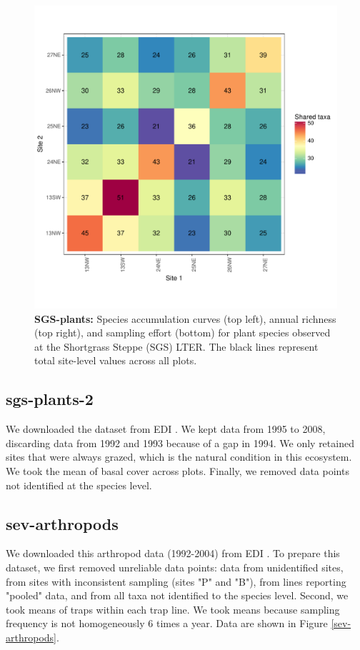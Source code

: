 \documentclass[11pt, oneside]{article}
\begin{document}
\begin{figure}[h!]
\includegraphics[scale = 0.4]{sgs-plants-catano_spp_shared.pdf}
\caption{{\bf SGS-plants:} Species accumulation curves (top left),  annual richness (top right), and sampling effort (bottom)  for plant species observed at the Shortgrass Steppe (SGS) LTER. The black lines represent total site-level values across all plots.}
\label{sgs-plants}
\end{figure}

\subsection{sgs-plants-2}
We downloaded the dataset from EDI \citep{Milchunas2014}. We kept data from 1995 to 2008, discarding data from 1992 and 1993 because of a gap in 1994. We only retained sites that were always grazed, which is the natural condition in this ecosystem. We took the mean of basal cover across plots. Finally, we removed data points not identified at the species level.


\subsection {sev-arthropods}
We downloaded this arthropod data (1992-2004) from EDI \citep{lightfoot_ground_2013}. To prepare this dataset, we first removed unreliable data points: data from unidentified sites, from sites with inconsistent sampling (sites "P" and "B"), from lines reporting "pooled" data, and from all taxa not identified to the species level. Second, we took means of traps within each trap line. We took means because sampling frequency is not homogeneously 6 times a year. Data are shown in Figure \ref{sev-arthropods}.
  
\end{document}
